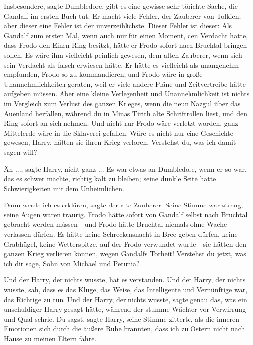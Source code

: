 \glqq Insbesondere\grqq{}, sagte Dumbledore, \glqq gibt es eine gewisse sehr
törichte Sache, die Gandalf im ersten Buch tut. Er macht viele Fehler, der
Zauberer von Tolkien; aber dieser eine Fehler ist der unverzeihlichste. Dieser
Fehler ist dieser: Als Gandalf zum ersten Mal, wenn auch nur für einen Moment,
den Verdacht hatte, dass Frodo den Einen Ring besitzt, hätte er Frodo sofort
nach Bruchtal bringen sollen. Es wäre ihm vielleicht peinlich gewesen, dem alten
Zauberer, wenn sich sein Verdacht als falsch erwiesen hätte. Er hätte es
vielleicht als unangenehm empfunden, Frodo so zu kommandieren, und Frodo wäre in
große Unannehmlichkeiten geraten, weil er viele andere Pläne und Zeitvertreibe
hätte aufgeben müssen. Aber eine kleine Verlegenheit und Unannehmlichkeit ist
nichts im Vergleich zum Verlust des ganzen Krieges, wenn die neun Nazgul über
das Auenland herfallen, während du in Minas Tirith alte Schriftrollen liest, und
den Ring sofort an sich nehmen. Und nicht nur Frodo wäre verletzt worden, ganz
Mittelerde wäre in die Sklaverei gefallen. Wäre es nicht nur eine Geschichte
gewesen, Harry, hätten sie ihren Krieg verloren. Verstehst du, was ich damit
sagen will?\grqq{}

\glqq Äh ...\grqq{}, sagte Harry, \glqq nicht ganz ...\grqq{} Es war etwas an
Dumbledore, wenn er so war, das es schwer machte, richtig kalt zu bleiben; seine
dunkle Seite hatte Schwierigkeiten mit dem Unheimlichen.

\glqq Dann werde ich es erklären\grqq{}, sagte der alte Zauberer. Seine Stimme
war streng, seine Augen waren traurig. \glqq Frodo hätte sofort von Gandalf
selbst nach Bruchtal gebracht werden müssen - und Frodo hätte Bruchtal niemals
ohne Wache verlassen dürfen. Es hätte keine Schreckensnacht in Bree geben
dürfen, keine Grabhügel, keine Wetterspitze, auf der Frodo verwundet wurde - sie
hätten den ganzen Krieg verlieren können, wegen Gandalfs Torheit! Verstehst du
jetzt, was ich dir sage, Sohn von Michael und Petunia?\grqq{}

Und der Harry, der nichts wusste, hat es verstanden. Und der Harry, der nichts
wusste, sah, dass es das Kluge, das Weise, das Intelligente und Vernünftige war,
das Richtige zu tun. Und der Harry, der nichts wusste, sagte genau das, was ein
unschuldiger Harry gesagt hätte, während der stumme Wächter vor Verwirrung und
Qual schrie. \glqq Du sagst\grqq{}, sagte Harry, seine Stimme zitterte, als die
inneren Emotionen sich durch die äußere Ruhe brannten, \glqq dass ich zu Ostern
nicht nach Hause zu meinen Eltern fahre.\grqq{}

